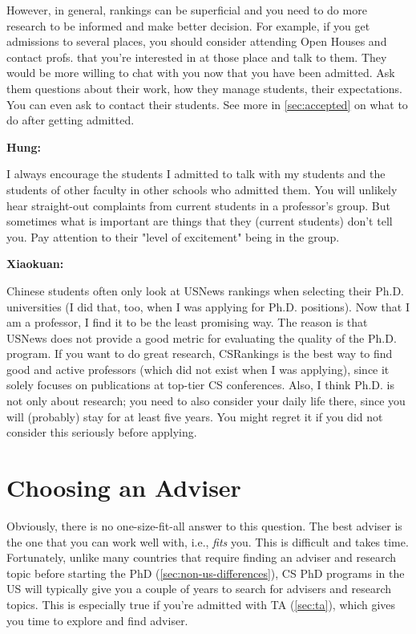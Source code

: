 \documentclass[oneside,11pt]{memoir}
\newenvironment{commentbox}[1][]{
  \small
  \begin{mybox}
    {\small \textbf{#1}}
  }{
  \end{mybox}
}
\begin{document}
However, in general, rankings can be superficial and you need to do more research to be informed and make better decision. For example, if you get admissions to several places, you should consider attending Open Houses and contact profs. that you're interested in at those place and talk to them. They would be more willing to chat with you now that you have been admitted.  Ask them questions about their work, how they manage students, their expectations. You can even ask to contact their students. See more in \autoref{sec:accepted} on what to do after getting admitted.


\begin{commentbox}[Hung:]
  I always encourage the students I admitted to talk with my students and the students of other faculty in other schools who admitted them. You will unlikely hear straight-out complaints from current students in a professor’s group. But sometimes what is important are things that they (current students) don’t tell you. Pay attention to their "level of excitement" being in the group.
\end{commentbox}

\begin{commentbox}[Xiaokuan:]
  Chinese students often only look at USNews rankings when selecting their Ph.D. universities (I did that, too, when I was applying for Ph.D. positions).
  Now that I am a professor, I find it to be the least promising way.
  The reason is that USNews does not provide a good metric for evaluating the quality of the Ph.D. program.
  If you want to do great research, CSRankings is the best way to find good and active professors (which did not exist when I was applying),
  since it solely focuses on publications at top-tier CS conferences.
  Also,
  I think Ph.D. is not only about research;
  you need to also consider your daily life there, since you will (probably) stay for at least five years.
  You might regret it if you did not consider this seriously before applying.
\end{commentbox}

\section{Choosing an Adviser}
Obviously, there is no one-size-fit-all answer to this question. The best adviser is the one that you can work well with, i.e., \emph{fits} you.  This is difficult and takes time. Fortunately, unlike many countries that require finding an adviser and research topic before starting the PhD (\autoref{sec:non-us-differences}), CS PhD programs in the US will typically give you a couple of years to search for advisers and research topics.  This is especially true if you're admitted with TA (\autoref{sec:ta}), which gives you time to explore and find adviser.
\end{document}
